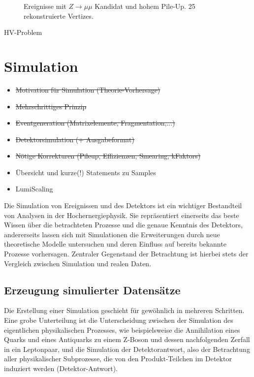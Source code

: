 \begin{figure}
\begin{minipage}[b]{0.48\textwidth}
        \captionsetup{format=plain}
        \caption{Ereignisse mit $Z \rightarrow \mu\mu$ Kandidat und hohem
            Pile-Up. 25 rekonstruierte Vertizes.}
        \label{fig:pileup}
    \end{minipage}
\end{figure}

HV-Problem \development



\section{Simulation}
\label{data_sim_selection:simulation}

\begin{itemize}
    \item \sout{Motivation für Simulation (Theorie-Vorhersage)}
    \item \sout{Mehrschrittiges Prinzip}
    \item \sout{Eventgeneration (Matrixelemente, Fragmentation,...)}
    \item \sout{Detektorsimulation (+ Ausgabeformat)}
    \item \sout{Nötige Korrekturen (Pileup, Effizienzen, Smearing, kFaktors)}
    \item Übersicht und kurze(!) Statements zu Samples
    \item LumiScaling
\end{itemize}

Die Simulation von Ereignissen und des Detektors ist ein wichtiger Bestandteil
von Analysen in der Hochernergiephysik. Sie repräsentiert einerseits das
beste Wissen über die betrachteten Prozesse und die genaue Kenntnis des
Detektors, andererseits lassen sich mit Simulationen die Erweiterungen durch
neue theoretische Modelle untersuchen und deren Einfluss auf bereits bekannte
Prozesse vorhersagen. Zentraler Gegenstand der Betrachtung ist hierbei stets
der Vergleich zwischen Simulation und realen Daten.



\subsection{Erzeugung simulierter Datensätze}
\label{event_generation}
Die Erstellung einer Simulation geschieht für gewöhnlich in mehreren Schritten.
Eine grobe Unterteilung ist die Unterscheidung zwischen der Simulation des
eigentlichen physikalischen Prozesses, wie beispielsweise die Annihilation
eines Quarks und eines Antiquarks zu einem Z-Boson und dessen nachfolgenden
Zerfall in ein Leptonpaar, und die Simulation der Detektorantwort, also der
Betrachtung aller physikalischer Subprozesse, die von den Produkt-Teilchen im
Detektor induziert werden (Detektor-Antwort).

